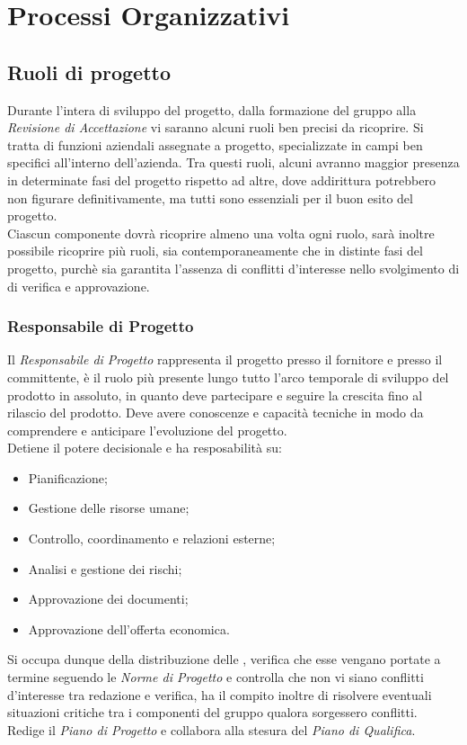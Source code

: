 \documentclass{scalatekids-article}
\begin{document}
\section{Processi Organizzativi}
\subsection{Ruoli di progetto}
Durante l'intera  di sviluppo del progetto, dalla formazione del gruppo alla
\textit{Revisione di Accettazione} vi saranno alcuni ruoli ben precisi da ricoprire. Si
tratta di funzioni aziendali assegnate a progetto, specializzate in campi ben
specifici all'interno dell'azienda. Tra questi ruoli, alcuni avranno maggior
presenza in determinate fasi del progetto rispetto ad altre, dove addirittura
potrebbero non figurare definitivamente, ma tutti sono essenziali per il buon
esito del progetto.\\ Ciascun componente dovrà ricoprire almeno una volta ogni
ruolo, sarà inoltre possibile ricoprire più ruoli, sia contemporaneamente che in
distinte fasi del progetto, purchè sia garantita l'assenza di conflitti
d'interesse nello svolgimento di  di verifica e approvazione.
\subsubsection{Responsabile di Progetto}
Il \textit{Responsabile di Progetto} rappresenta il progetto presso il fornitore
e presso il committente, è il ruolo più presente lungo tutto l'arco temporale di
sviluppo del prodotto in assoluto, in quanto deve partecipare e seguire la
crescita fino al rilascio del prodotto. Deve avere conoscenze e capacità
tecniche in modo da comprendere e anticipare l'evoluzione del progetto.\\
Detiene il potere decisionale e ha resposabilità su:
\begin{itemize}
\item Pianificazione;
\item Gestione delle risorse umane;
\item Controllo, coordinamento e relazioni esterne;
\item Analisi e gestione dei rischi;
\item Approvazione dei documenti;
\item Approvazione dell'offerta economica.
\end{itemize}
Si occupa dunque della distribuzione delle , verifica che esse vengano
portate a termine seguendo le \textit{Norme di Progetto} e controlla che non vi
siano conflitti d'interesse tra redazione e verifica, ha il compito inoltre di
risolvere eventuali situazioni critiche tra i componenti del gruppo qualora
sorgessero conflitti.\\ Redige il \textit{Piano di Progetto} e collabora alla
stesura del \textit{Piano di Qualifica}.
\end{document}
